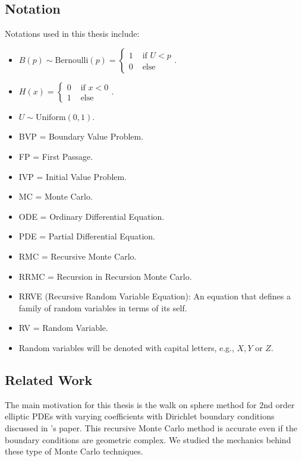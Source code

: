 \documentclass[a4paper,12pt]{article}
\begin{document}
\subsection{Notation}
Notations used in this thesis include:

\begin{itemize}
    \item $B(p) \sim \text{Bernoulli}(p) =
              \begin{cases}
                  1 & \text{ if } U<p \\
                  0 & \text{ else }
              \end{cases}. $
    \item $ H(x) =
              \begin{cases}
                  0 & \text{ if } x<0 \\
                  1 & \text{ else }
              \end{cases}.$
    \item $U \sim \text{Uniform}(0,1)$.
    \item BVP = Boundary Value Problem.
    \item FP = First Passage.
    \item IVP = Initial Value Problem.
    \item MC = Monte Carlo.
    \item ODE = Ordinary Differential Equation.
    \item PDE = Partial Differential Equation.
    \item RMC = Recursive Monte Carlo.
    \item RRMC = Recursion in Recursion Monte Carlo.
    \item RRVE (Recursive Random Variable Equation): An equation that defines a
          family of random variables in terms of its self.
    \item RV = Random Variable.
    \item Random variables will be denoted with capital letters, e.g., $X,Y$ or $Z$.
\end{itemize}

\subsection{Related Work}
The main motivation for this thesis is the walk on sphere method for $2$nd order elliptic PDEs
with varying coefficients with Dirichlet boundary conditions
discussed in \citeauthor{sawhney_grid-free_2022}'s
\citeyear{sawhney_grid-free_2022} \cite{sawhney_grid-free_2022} paper.
This recursive Monte Carlo method
is accurate even if the boundary conditions are geometric complex. We studied the
mechanics behind these type of Monte Carlo techniques.
\end{document}
